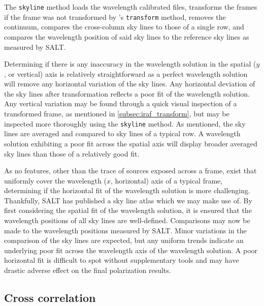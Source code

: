 The \texttt{skyline} method loads the wavelength calibrated files, transforms the frames if the frame was not transformed by \iraf's \texttt{transform} method, removes the continuum, compares the cross-column sky lines to those of a single row, and compares the wavelength position of said sky lines to the reference sky lines as measured by \gls{SALT}.

Determining if there is any inaccuracy in the wavelength solution in the spatial ($y$, or vertical) axis is relatively straightforward as a perfect wavelength solution will remove any horizontal variation of the sky lines. Any horizontal deviation of the sky lines after transformation reflects a poor fit of the wavelength solution. Any vertical variation may be found through a quick visual inspection of a transformed frame, as mentioned in \autoref{subsec:iraf_transform}, but may be inspected more thoroughly using the \texttt{skyline} method. As mentioned, the sky lines are averaged and compared to sky lines of a typical row. A wavelength solution exhibiting a poor fit across the spatial axis will display broader averaged sky lines than those of a relatively good fit.

As no features, other than the trace of sources exposed across a frame, exist that uniformly cover the wavelength ($x$, horizontal) axis of a typical frame, determining if the horizontal fit of the wavelength solution is more challenging. Thankfully, \gls{SALT} has published a sky line atlas which we may make use of. By first considering the spatial fit of the wavelength solution, it is ensured that the wavelength positions of all sky lines are well-defined. Comparisons may now be made to the wavelength positions measured by \gls{SALT}. Minor variations in the comparison of the sky lines are expected, but any uniform trends indicate an underlying poor fit across the wavelength axis of the wavelength solution. A poor horizontal fit is difficult to spot without supplementary tools and may have drastic adverse effect on the final polarization results.

\subsection{Cross correlation} \label{subsec:stops_correlate}



